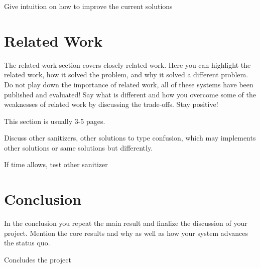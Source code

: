 \documentclass[a4paper,11pt,oneside]{report}
\begin{document}
Give intuition on how to improve the current solutions

\chapter{Related Work}

The related work section covers closely related work. Here you can highlight
the related work, how it solved the problem, and why it solved a different
problem. Do not play down the importance of related work, all of these
systems have been published and evaluated! Say what is different and how
you overcome some of the weaknesses of related work by discussing the 
trade-offs. Stay positive!

This section is usually 3-5 pages.

Discuss other sanitizers, other solutions to type confusion,
which may implements other solutions or same solutions but differently.

If time allows, test other sanitizer




\chapter{Conclusion}

In the conclusion you repeat the main result and finalize the discussion of
your project. Mention the core results and why as well as how your system
advances the status quo.

Concludes the project 
\cleardoublepage
{}
{}
\printbibliography

%
%
\end{document}
